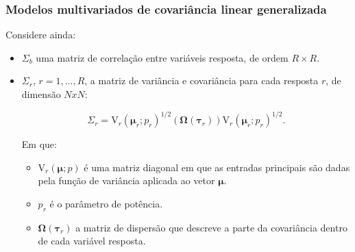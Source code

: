 \documentclass[10pt,
  aspectratio=169,
  serif,
  mathserif,
  professionalfont,
  compress,
  handout,
  ]{beamer}\usepackage[]{graphicx}\usepackage[]{color}
\begin{document}
\begin{frame}
\frametitle{Modelos multivariados de covariância linear generalizada}

Considere ainda:

\begin{itemize}
  
  \itemsep 2ex
  
    \item $\Sigma_b$ uma matriz de correlação entre variáveis resposta, de ordem $R \times R$.
    
  \item $\Sigma_r$, $r = 1,..., R$, a matriz de variância e covariância para cada resposta $r$, de dimensão $NxN$:
  
$$
\Sigma_r = \mathrm{V}_r\left(\boldsymbol{\mu}_r; p_r\right)^{1/2}(\boldsymbol{\Omega}\left(\boldsymbol{\tau}_r\right))\mathrm{V}_r\left(\boldsymbol{\mu}_r; p_r\right)^{1/2}.
$$

Em que:

  \begin{itemize}
    \item $\mathrm{V}_r\left(\boldsymbol{\mu}; p\right)$ é uma matriz diagonal em que as entradas principais são dadas pela função de variância aplicada ao vetor $\boldsymbol{\mu}$. 
  
  \item $p_r$ é o parâmetro de potência. 
  
  \item $\boldsymbol{\Omega}\left(\boldsymbol{\tau}_r\right)$ a matriz de dispersão que descreve a parte da covariância dentro de cada variável resposta. 
  \end{itemize}
  

\end{itemize}

\end{frame}

\end{document}
